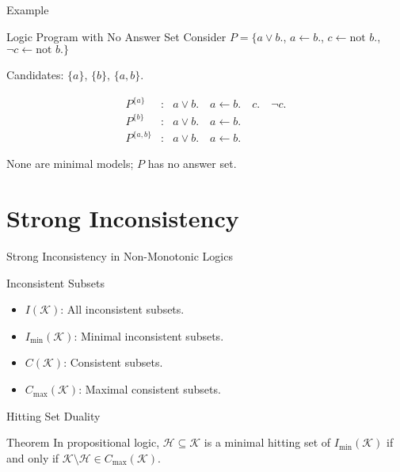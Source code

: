 \begin{frame}{Example}
    \begin{exampleblock}{Logic Program with No Answer Set}
        Consider $P = \{a \lor b.$, $a \leftarrow b.$, $c \leftarrow \text{not }b.$, $\neg c \leftarrow \text{not }b.\}$

        Candidates: $\{a\}$, $\{b\}$, $\{a, b\}$.

        \[
            \begin{array}{lcl}
                P^{\{a\}}   & : & a \lor b. \quad a \leftarrow b. \quad c. \quad \neg c. \\
                P^{\{b\}}   & : & a \lor b. \quad a \leftarrow b.                        \\
                P^{\{a,b\}} & : & a \lor b. \quad a \leftarrow b.
            \end{array}
        \]

        None are minimal models; $P$ has no answer set.
    \end{exampleblock}
\end{frame}

\section{Strong Inconsistency}

\begin{frame}{Strong Inconsistency in Non-Monotonic Logics}
    \begin{block}{Inconsistent Subsets}
        \begin{itemize}
            \item $I(\mathcal{K})$: All inconsistent subsets.
            \item $I_{\min}(\mathcal{K})$: Minimal inconsistent subsets.
            \item $C(\mathcal{K})$: Consistent subsets.
            \item $C_{\max}(\mathcal{K})$: Maximal consistent subsets.
        \end{itemize}
    \end{block}
\end{frame}

\begin{frame}{Hitting Set Duality}
    \begin{block}{Theorem}
        In propositional logic, $\mathcal{H} \subseteq \mathcal{K}$ is a minimal hitting set of $I_{\min}(\mathcal{K})$ if and only if $\mathcal{K} \setminus \mathcal{H} \in C_{\max}(\mathcal{K})$.
    \end{block}
\end{frame}

